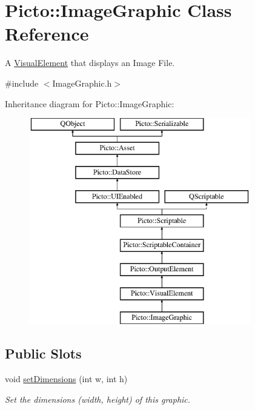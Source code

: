 \hypertarget{class_picto_1_1_image_graphic}{\section{Picto\-:\-:Image\-Graphic Class Reference}
\label{class_picto_1_1_image_graphic}
}


A \hyperlink{struct_picto_1_1_visual_element}{Visual\-Element} that displays an Image File.  




{\ttfamily \#include $<$Image\-Graphic.\-h$>$}

Inheritance diagram for Picto\-:\-:Image\-Graphic\-:\begin{figure}[H]
\begin{center}
\leavevmode
\includegraphics[height=9.000000cm]{class_picto_1_1_image_graphic}
\end{center}
\end{figure}
\subsection*{Public Slots}
\begin{DoxyCompactItemize}
\item 
\hypertarget{class_picto_1_1_image_graphic_a7b55d2c6db6a52f9eaad96d742dd5bab}{void \hyperlink{class_picto_1_1_image_graphic_a7b55d2c6db6a52f9eaad96d742dd5bab}{set\-Dimensions} (int w, int h)}\label{class_picto_1_1_image_graphic_a7b55d2c6db6a52f9eaad96d742dd5bab}

\begin{DoxyCompactList}\small\item\em Set the dimensions (width, height) of this graphic. \end{DoxyCompactList}\end{DoxyCompactItemize}
